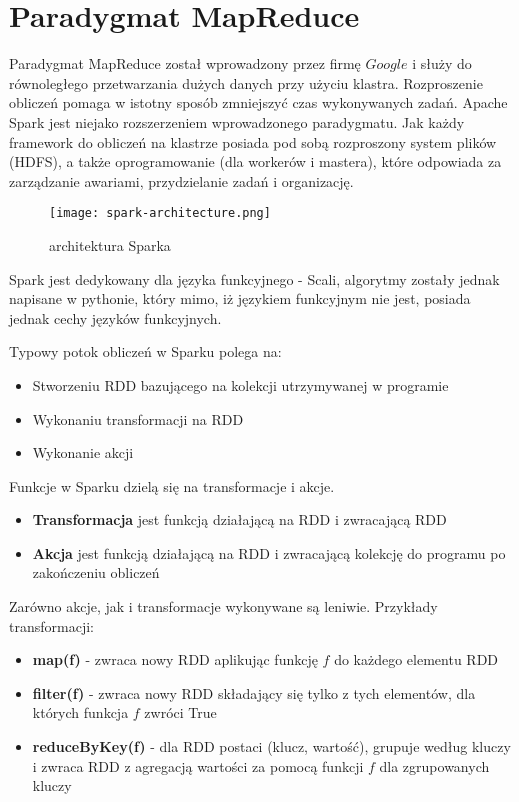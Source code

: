 \documentclass[magisterska]{pracamgr}
\theoremstyle{plain}
\theoremstyle{definition}
\theoremstyle{remark}
\begin{document}
\section{Paradygmat MapReduce}

Paradygmat MapReduce został wprowadzony przez firmę $Google$ i służy do równoległego przetwarzania
dużych danych przy użyciu klastra.
Rozproszenie obliczeń pomaga w istotny sposób zmniejszyć czas wykonywanych zadań.
Apache Spark jest niejako rozszerzeniem wprowadzonego paradygmatu. 
Jak każdy framework do obliczeń na klastrze posiada pod sobą rozproszony system plików (HDFS), 
a także oprogramowanie (dla workerów i mastera), które odpowiada za zarządzanie awariami, przydzielanie 
zadań i organizację. 
\newpage

\begin{figure}
 \caption{architektura Sparka}
 \texttt{[image: spark-architecture.png]}
\end{figure}

Spark jest dedykowany dla języka funkcyjnego - Scali, algorytmy zostały jednak napisane w pythonie, który 
mimo, iż językiem funkcyjnym nie jest, posiada jednak cechy języków funkcyjnych. 

Typowy potok obliczeń w Sparku polega na:
\begin{itemize}
 \item Stworzeniu RDD bazującego na kolekcji utrzymywanej w programie
 \item Wykonaniu transformacji na RDD
 \item Wykonanie akcji
\end{itemize}

Funkcje w Sparku dzielą się na transformacje i akcje. 
\begin{itemize}
 \item \textbf{Transformacja} jest funkcją działającą na RDD i zwracającą RDD
 \item \textbf{Akcja} jest funkcją działającą na RDD i zwracającą kolekcję do programu po zakończeniu obliczeń
\end{itemize}
Zarówno akcje, jak i transformacje wykonywane są leniwie. Przykłady transformacji:
\begin{itemize}
 \item \textbf{map(f)} - zwraca nowy RDD aplikując funkcję $f$ do każdego elementu RDD
 \item \textbf{filter(f)} - zwraca nowy RDD składający się tylko z tych elementów, dla których funkcja $f$ zwróci True
 \item \textbf{reduceByKey(f)} - dla RDD postaci (klucz, wartość), grupuje według kluczy i zwraca RDD z agregacją wartości 
 za pomocą funkcji $f$ dla zgrupowanych kluczy
\end{itemize}
\end{document}
